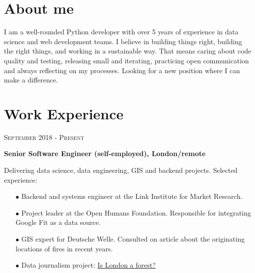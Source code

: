 \documentclass[10pt]{article} %
\begin{document}
\begin{minipage}[t]{0.5\textwidth} %
\vspace{0pt} %
	



\section{About me} 


\normalsize{I am a well-rounded Python developer with over 5 years of experience in data science and web development teams. I believe in building things right, building the right things, and working in a sustainable way. That means caring about code quality and testing, releasing small and iterating, practicing open communication and always reflecting on my processes. Looking for a new position where I can make a difference.}
	



\section{Work Experience} 

{\raggedleft\textsc{September 2018 - Present}\par}

    {\raggedright\large \textbf{Senior Software Engineer (self-employed), London/remote}\\
}

\normalsize{Delivering data science, data engineering, GIS and backend projects. Selected experience:}
\begin{itemize}
\item[$\bullet$] Backend and systems engineer at the Link Institute for Market Research.
\item[$\bullet$] Project leader at the Open Humans Foundation. Responsible for integrating Google Fit as a data source.
\item[$\bullet$] GIS expert for Deutsche Welle. Consulted on article about the originating locations of fires in recent years.
\item[$\bullet$] Data journalism project: \href{https://www.codementor.io/blog/london-forest-gis-5tipxvoha5}{Is London a forest?}
\end{itemize}


\end{minipage}
\end{document}
